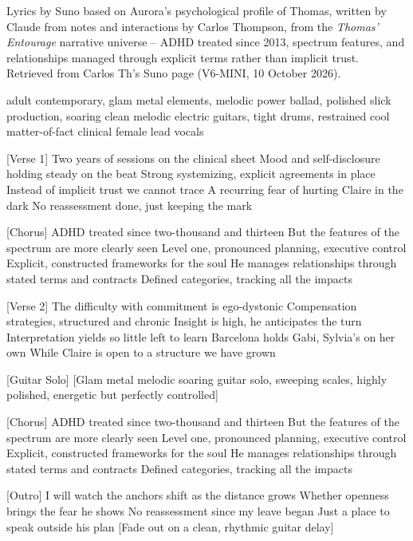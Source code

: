 %

\begin{notes}
Lyrics by Suno based on Aurora's psychological profile of Thomas, written by Claude from notes and interactions by Carlos Thompson, from the \emph{Thomas' Entourage} narrative universe -- ADHD treated since 2013, spectrum features, and relationships managed through explicit terms rather than implicit trust. Retrieved from Carlos Th's Suno page (V6-MINI, 10 October 2026).
\end{notes}
\begin{style}
adult contemporary, glam metal elements, melodic power ballad, polished slick production, soaring clean melodic electric guitars, tight drums, restrained cool matter-of-fact clinical female lead vocals
\end{style}
\begin{lyrics}

[Verse 1]
Two years of sessions on the clinical sheet
Mood and self-disclosure holding steady on the beat
Strong systemizing, explicit agreements in place
Instead of implicit trust we cannot trace
A recurring fear of hurting Claire in the dark
No reassessment done, just keeping the mark

[Chorus]
ADHD treated since two-thousand and thirteen
But the features of the spectrum are more clearly seen
Level one, pronounced planning, executive control
Explicit, constructed frameworks for the soul
He manages relationships through stated terms and contracts
Defined categories, tracking all the impacts

[Verse 2]
The difficulty with commitment is ego-dystonic
Compensation strategies, structured and chronic
Insight is high, he anticipates the turn
Interpretation yields so little left to learn
Barcelona holds Gabi, Sylvia's on her own
While Claire is open to a structure we have grown

[Guitar Solo]
[Glam metal melodic soaring guitar solo, sweeping scales, highly polished, energetic but perfectly controlled]

[Chorus]
ADHD treated since two-thousand and thirteen
But the features of the spectrum are more clearly seen
Level one, pronounced planning, executive control
Explicit, constructed frameworks for the soul
He manages relationships through stated terms and contracts
Defined categories, tracking all the impacts

[Outro]
I will watch the anchors shift as the distance grows
Whether openness brings the fear he shows
No reassessment since my leave began
Just a place to speak outside his plan
[Fade out on a clean, rhythmic guitar delay]
\end{lyrics}

